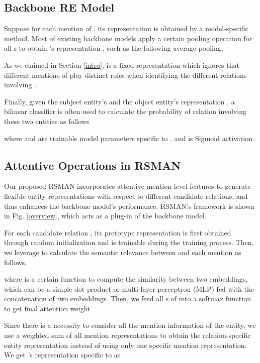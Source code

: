 \documentclass[11pt]{article}
\begin{document}
\subsection{Backbone RE Model}




Suppose for each mention of , its representation  is obtained by a model-specific method. Most of existing backbone models apply a certain pooling operation for all s to obtain 's representation , such as the following average pooling,

As we claimed in Section \ref{intro},  is a fixed representation which ignores that different mentions of  play distinct roles when identifying the different relations involving . 

Finally, given the subject entity's  and the object entity's representation , a bilinear classifier is often used to calculate the probability of relation  involving these two entities as follows

where  and  are trainable model parameters specific to , and  is Sigmoid activation. 


\subsection{Attentive Operations in RSMAN}
Our proposed RSMAN incorporates attentive mention-level features to generate flexible entity representations with respect to different candidate relations, and thus enhances the backbone model's performance. RSMAN's framework is shown in Fig. \ref{overview}, which acts as a plug-in of the backbone model. 

For each candidate relation , its prototype representation  is first obtained through random initialization and is trainable during the training process. Then, we leverage  to calculate the semantic relevance between  and each mention  as follows,

where  is a certain function to compute the similarity between two embeddings, which can be a simple dot-product or multi-layer perceptron (MLP) fed with the concatenation of two embeddings. Then, we feed all s of  into a softmax function to get final attention weight


Since there is a necessity to consider all the mention information of the entity, we  use a weighted sum of all mention representations to obtain the relation-specific entity representation instead of using only one specific mention representation. We get 's representation specific to  as
\end{document}
